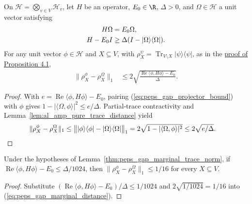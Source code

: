 \begin{lemma}
    \label{thm:peps_gap_marginal_trace_norm}
    \leanok
    On $\mathcal H=\bigotimes_{v\in V}\mathcal H_v$, let $H$ be an operator,
    $E_0\in\R$, $\Delta>0$, and $\Omega\in\mathcal H$ a unit vector satisfying
    \begin{align}
        H\Omega & = E_0\Omega, \notag                         \\
        H-E_0I  & \geq\Delta(I-|\Omega\rangle\langle\Omega|).
        \label{eq:peps_gap_projector_bound}
    \end{align}
    For any unit vector $\phi\in\mathcal H$ and $X\subseteq V$, with
    $\rho_X^\psi=\operatorname{Tr}_{V\setminus X}|\psi\rangle\langle\psi|$, as in
    the
    \href{https://github.com/openai/math/blob/adc7f1241b42e322a6451854ab7e4b4c146bf78a/preprints/Polynomial-PEPS-approximation-of-gapped-square-grid-ground-states-September-24-2026/build/sections/03-patches.tex\#L339-L365}{proof of Proposition 4.1},
    \begin{align}
        \|\rho_X^\phi-\rho_X^\Omega\|_1
         & \leq 2\sqrt{\frac{\operatorname{Re}\langle\phi,H\phi\rangle-E_0}{\Delta}}.
        \label{eq:peps_gap_marginal_distance}
    \end{align}
\end{lemma}
\begin{proof}
    \leanok
    With $e=\operatorname{Re}\langle\phi,H\phi\rangle-E_0$, pairing
    (\ref{eq:peps_gap_projector_bound}) with $\phi$ gives
    $1-|\langle\Omega,\phi\rangle|^2\leq e/\Delta$. Partial-trace contractivity
    and Lemma~\ref{lem:al_amp_pure_trace_distance} yield
    \begin{align}
        \|\rho_X^\phi-\rho_X^\Omega\|_1
         & \leq\bigl\||\phi\rangle\langle\phi|-|\Omega\rangle\langle\Omega|\bigr\|_1
        =2\sqrt{1-|\langle\Omega,\phi\rangle|^2}
        \leq2\sqrt{e/\Delta}.\notag
    \end{align}
\end{proof}

\begin{lemma}
    \label{thm:peps_gap_marginal_one_sixteenth}
    \leanok
    Under the hypotheses of Lemma~\ref{thm:peps_gap_marginal_trace_norm}, if
    $\operatorname{Re}\langle\phi,H\phi\rangle-E_0\leq\Delta/1024$, then
    $\|\rho_X^\phi-\rho_X^\Omega\|_1\leq1/16$ for every $X\subseteq V$.
\end{lemma}
\begin{proof}
    \leanok
    Substitute $(\operatorname{Re}\langle\phi,H\phi\rangle-E_0)/\Delta\le1/1024$
    and $2\sqrt{1/1024}=1/16$ into (\ref{eq:peps_gap_marginal_distance}).
\end{proof}

